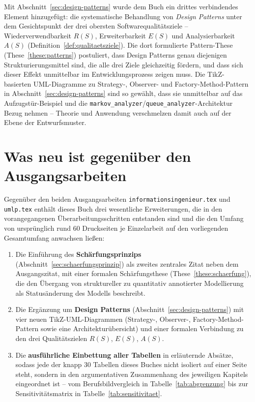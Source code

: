 ﻿\documentclass[a4paper,12pt]{report}
\theoremstyle{definition}
\begin{document}
Mit Abschnitt~\ref{sec:design-patterns} wurde dem Buch ein drittes
verbindendes Element hinzugefügt: die systematische Behandlung von
\emph{Design Patterns} unter dem Gesichtspunkt der drei obersten
Softwarequalitätsziele -- Wiederverwendbarkeit $R(S)$, Erweiterbarkeit
$E(S)$ und Analysierbarkeit $A(S)$ (Definition~\ref{def:qualitaetsziele}).
Die dort formulierte Pattern-These (These~\ref{these:patterns}) postuliert,
dass Design Patterns genau diejenigen Strukturierungsmittel sind, die alle
drei Ziele gleichzeitig fördern, und dass sich dieser Effekt unmittelbar im
Entwicklungsprozess zeigen muss. Die TikZ-basierten UML-Diagramme zu
Strategy-, Observer- und Factory-Method-Pattern in
Abschnitt~\ref{sec:design-patterns} sind so gewählt, dass sie unmittelbar
auf das Aufzugstür-Beispiel und die \texttt{markov\_analyzer}/\texttt{queue\_analyzer}-Architektur
Bezug nehmen -- Theorie und Anwendung verschmelzen damit auch auf der Ebene
der Entwurfsmuster.

\section*{Was neu ist gegenüber den Ausgangsarbeiten}

Gegenüber den beiden Ausgangsarbeiten \texttt{informationsingenieur.tex}
und \texttt{umlp.tex} enthält dieses Buch drei wesentliche Erweiterungen,
die in den vorangegangenen Überarbeitungsschritten entstanden sind und die
den Umfang von ursprünglich rund 60 Druckseiten je Einzelarbeit auf den
vorliegenden Gesamtumfang anwachsen ließen:

\begin{enumerate}
  \item[(1)] Die Einführung des \textbf{Schärfungsprinzips}
  (Abschnitt~\ref{sec:schaerfungsprinzip}) als zweites zentrales Zitat neben
  dem Ausgangszitat, mit einer formalen Schärfungsthese
  (These~\ref{these:schaerfung}), die den Übergang von struktureller zu
  quantitativ annotierter Modellierung als Statusänderung des Modells
  beschreibt.

  \item[(2)] Die Ergänzung um \textbf{Design Patterns}
  (Abschnitt~\ref{sec:design-patterns}) mit vier neuen TikZ-UML-Diagrammen
  (Strategy-, Observer-, Factory-Method-Pattern sowie eine
  Architekturübersicht) und einer formalen Verbindung zu den drei
  Qualitätszielen $R(S)$, $E(S)$, $A(S)$.

  \item[(3)] Die \textbf{ausführliche Einbettung aller Tabellen} in
  erläuternde Absätze, sodass jede der knapp 30 Tabellen dieses Buches nicht
  isoliert auf einer Seite steht, sondern in den argumentativen
  Zusammenhang des jeweiligen Kapitels eingeordnet ist -- vom
  Berufsbildvergleich in Tabelle~\ref{tab:abgrenzung} bis zur
  Sensitivitätsmatrix in Tabelle~\ref{tab:sensitivitaet}.
\end{enumerate}
\end{document}
